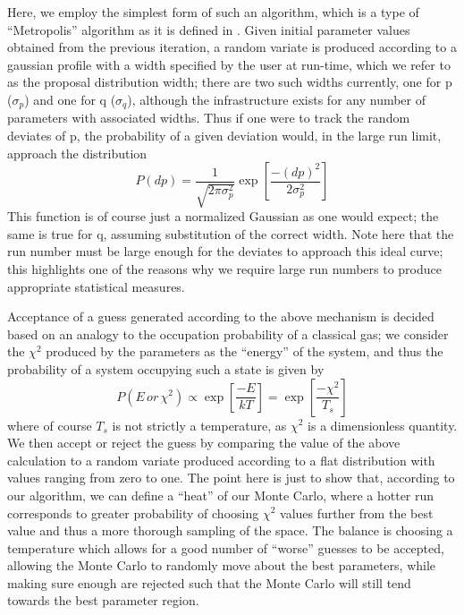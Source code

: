 \documentclass[twocolumn,letterpaper,10pt]{article}
\begin{document}
Here, we employ the simplest form of such an algorithm, which is a type of ``Metropolis'' algorithm as it is defined in \citet{dunkley05}. Given initial parameter values obtained from the previous iteration, a random variate is produced according to a gaussian profile with a width specified by the user at run-time, which we refer to as the proposal distribution width; there are two such widths currently, one for p ($\sigma_p$) and one for q ($\sigma_q$), although the infrastructure exists for any number of parameters with associated widths. Thus if one were to track the random deviates of p, the probability of a given deviation would, in the large run limit, approach the distribution
$$
P(dp)=\frac{1}{\sqrt{2\pi\sigma_p^2}}\exp\left[{\frac{-(dp)^2}{2\sigma_p^2}}\right]
$$
This function is of course just a normalized Gaussian as one would expect; the same is true for q, assuming substitution of the correct width. Note here that the run number must be large enough for the deviates to approach this ideal curve; this highlights one of the reasons why we require large run numbers to produce appropriate statistical measures.

Acceptance of a guess generated according to the above mechanism is decided based on an analogy to the occupation probability of a classical gas; we consider the $\chi^2$ produced by the parameters as the ``energy'' of the system, and thus the probability of a system occupying such a state is given by
$$
P(E \, or \, \chi^2)\propto \exp\left[\frac{-E}{kT}\right] = \exp\left[\frac{-\chi^2}{T_s}\right]
$$
where of course $T_s$ is not strictly a temperature, as $\chi^2$ is a dimensionless quantity. We then accept or reject the guess by comparing the value of the above calculation to a random variate produced according to a flat distribution with values ranging from zero to one. The point here is just to show that, according to our algorithm, we can define a ``heat'' of our Monte Carlo, where a hotter run corresponds to greater probability of choosing $\chi^2$ values further from the best value and thus a more thorough sampling of the space. The balance is choosing a temperature which allows for a good number of ``worse'' guesses to be accepted, allowing the Monte Carlo to randomly move about the best parameters, while making sure enough are rejected such that the Monte Carlo will still tend towards the best parameter region.
\end{document}
